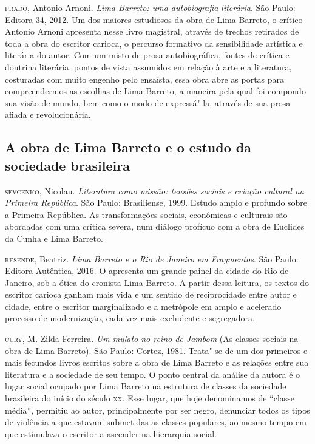 \documentclass{extarticle}
\begin{document}
\textsc{prado}, Antonio Arnoni. \emph{Lima Barreto: uma autobiografia literária}.
São Paulo: Editora 34, 2012. Um dos maiores estudiosos da obra de Lima
Barreto, o crítico Antonio Arnoni apresenta nesse livro magistral,
através de trechos retirados de toda a obra do escritor carioca, o
percurso formativo da sensibilidade artística e literária do autor. Com
um misto de prosa autobiográfica, fontes de crítica e doutrina
literária, pontos de vista assumidos em relação à arte e a literatura,
costuradas com muito engenho pelo ensaísta, essa obra abre as portas
para compreendermos as escolhas de Lima Barreto, a maneira pela qual foi
compondo sua visão de mundo, bem como o modo de expressá"-la, através de
sua prosa afiada e revolucionária.


\subsection{A obra de Lima Barreto e o estudo da sociedade brasileira}

\textsc{sevcenko}, Nicolau. \emph{Literatura como missão: tensões sociais e
criação cultural na Primeira República}. São Paulo: Brasiliense, 1999.
Estudo amplo e profundo sobre a Primeira República. As transformações
sociais, econômicas e culturais são abordadas com uma crítica severa,
num diálogo profícuo com a obra de Euclides da Cunha e Lima Barreto.

\textsc{resende}, Beatriz. \emph{Lima Barreto e o Rio de Janeiro em Fragmentos}.
São Paulo: Editora Autêntica, 2016. O apresenta um grande painel da
cidade do Rio de Janeiro, sob a ótica do cronista Lima Barreto. A partir
dessa leitura, os textos do escritor carioca ganham mais vida e um
sentido de reciprocidade entre autor e cidade, entre o escritor
marginalizado e a metrópole em amplo e acelerado processo de
modernização, cada vez mais excludente e segregadora.

\textsc{cury}, M. Zilda Ferreira. \emph{Um mulato no reino de
Jambom} (As classes sociais na obra de Lima Barreto). São
Paulo: Cortez, 1981. Trata"-se de um dos primeiros e mais fecundos livros
escritos sobre a obra de Lima Barreto e as relações entre sua literatura
e a sociedade de seu tempo. O ponto central da análise da autora é o
lugar social ocupado por Lima Barreto na estrutura de classes da
sociedade brasileira do início do século \textsc{xx}. Esse lugar, que hoje
denominamos de ``classe média'', permitiu ao autor, principalmente por
ser negro, denunciar todos os tipos de violência a que estavam
submetidas as classes populares, ao mesmo tempo em que estimulava o
escritor a ascender na hierarquia social.
\end{document}
